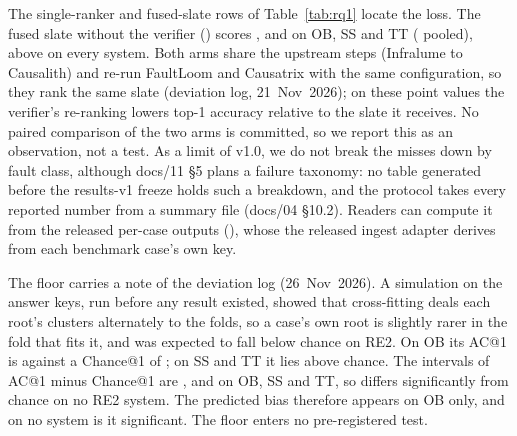 
The single-ranker and fused-slate rows of Table~\ref{tab:rq1} locate the loss.
The fused slate without the verifier () scores ,  and  on OB, SS and TT ( pooled), above  on every system.
Both arms share the upstream steps (Infralume to Causalith) and re-run FaultLoom and Causatrix with the same configuration, so they rank the same slate (deviation log, 21~Nov~2026); on these point values the verifier's re-ranking lowers top-1 accuracy relative to the slate it receives.
No paired comparison of the two arms is committed, so we report this as an observation, not a test.
As a limit of v1.0, we do not break the misses down by fault class, although docs/11 §5 plans a failure taxonomy: no table generated before the results-v1 freeze holds such a breakdown, and the protocol takes every reported number from a summary file (docs/04 §10.2).
Readers can compute it from the released per-case outputs (), whose  the released ingest adapter derives from each benchmark case's own key.

The  floor carries a note of the deviation log (26~Nov~2026).
A simulation on the answer keys, run before any  result existed, showed that cross-fitting deals each root's clusters alternately to the folds, so a case's own root is slightly rarer in the fold that fits it, and  was expected to fall below chance on RE2.
On OB its AC@1 is  against a Chance@1 of ; on SS and TT it lies above chance.
The intervals of AC@1 minus Chance@1 are ,  and  on OB, SS and TT, so  differs significantly from chance on no RE2 system.
The predicted bias therefore appears on OB only, and on no system is it significant.
The floor enters no pre-registered test.

